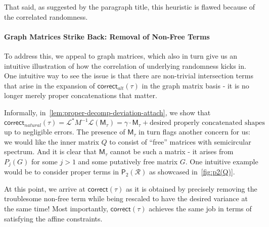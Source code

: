\documentclass[12pt]{article}
\newcommand{\calR}{\mathcal{R}}
\newcommand{\gam}{\gamma}
\newcommand{\cm}{\mathsf{M} }
\newcommand{\corr}{\mathsf{correct}}
\newcommand{\fp}{\mathsf{P}}
\newcommand{\calL}{\mathcal{L}}
\begin{document}
That said, as suggested by the paragraph title, this heuristic is flawed because of the correlated randomness.%
\paragraph{Graph Matrices Strike Back: Removal of Non-Free Terms}
To address this, we appeal to graph matrices, which also in turn give us an intuitive illustration of how the correlation of underlying randomness kicks in. One intuitive way to see the issue is that there are non-trivial intersection terms that arise in the expansion of $\corr_{alt}(\tau)$ in the graph matrix basis - it is no longer merely proper concatenations that matter.

Informally, in~\cref{lem:proper-decomp-deviation-attach}, we show that \[ 
\corr_{natural}(\tau) = \calL^*M^{-1}\calL(\cm_\tau) = \gam\cdot \cm_\tau + \text{desired properly concatenated shapes} 
\]
up to negligible errors. The presence of $\cm_\tau$ in turn flags another concern for us: we would like the inner matrix $Q$ to consist of ``free'' matrices with semicircular spectrum. And it is clear that $\cm_\tau$ cannot be such a matrix - it arises from $P_j(G)$ for some $j>1$ and some putatively free matrix $G$. One intuitive example would be to consider proper terms in $\fp_2(\calR)$ as showcased in~\cref{fig:p2(Q)}.

At this point, we arrive at $\corr(\tau)$ as it is obtained by precisely removing the troublesome non-free term while being rescaled to have the desired variance at the same time! %
Most importantly, $\corr(\tau)$ achieves the same job in terms of satisfying the affine constraints.
%
%
%
%
%
%
\end{document}
